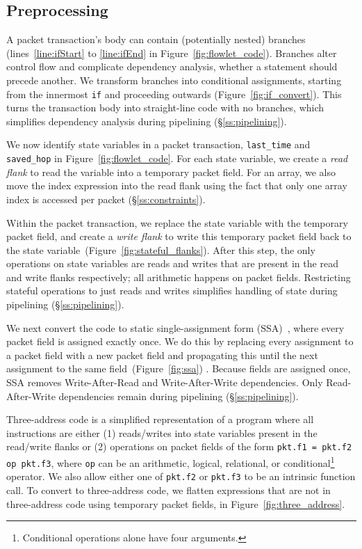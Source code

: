 \subsection{Preprocessing}
\label{ss:preprocessing}

 A packet transaction's body can contain (potentially
nested) branches (\eg lines~\ref{line:ifStart} to \ref{line:ifEnd} in
Figure~\ref{fig:flowlet_code}).  Branches alter control flow and complicate
dependency analysis, \ie whether a statement should precede another.  We
transform branches into conditional assignments, starting from the innermost
\texttt{if} and proceeding outwards (Figure~\ref{fig:if_convert}).  This turns
the transaction body into straight-line code with no branches, which simplifies
dependency analysis during pipelining (\S\ref{ss:pipelining}).

 We now identify state variables
in a packet transaction, \eg \texttt{last\_time} and \texttt{saved\_hop} in
Figure~\ref{fig:flowlet_code}.  For each state variable, we create a
\textit{read flank} to read the variable into a temporary packet field.  For an
array, we also move the index expression into the read flank using the fact
that only one array index is accessed per packet (\S\ref{ss:constraints}).

Within the packet transaction, we replace the state variable with the temporary
packet field, and create a \textit{write flank} to write this temporary packet
field back to the state variable~(Figure~\ref{fig:stateful_flanks}). After this
step, the only operations on state variables are reads and writes that are
present in the read and write flanks respectively; all arithmetic happens on
packet fields. Restricting stateful operations to just reads and writes
simplifies handling of state during pipelining (\S\ref{ss:pipelining}).

 We next convert the code to
static single-assignment form (SSA)~\cite{ssa}, where every packet field is
assigned exactly once. We do this by replacing every assignment to a packet
field with a new packet field and propagating this until the next assignment to
the same field~(Figure~\ref{fig:ssa}) .  Because fields are assigned once, SSA
removes Write-After-Read and Write-After-Write dependencies.  Only
Read-After-Write dependencies remain during pipelining (\S\ref{ss:pipelining}).

 Three-address code is a simplified
representation of a program where all instructions are either (1) reads/writes
into state variables present in the read/write flanks or (2) operations on
packet fields of the form \texttt{pkt.f1 = pkt.f2 op pkt.f3}, where \texttt{op}
can be an arithmetic, logical, relational, or conditional\footnote{Conditional
operations alone have four arguments.} operator. We also allow either one of
{\tt pkt.f2} or {\tt pkt.f3} to be an intrinsic function call.  To convert to
three-address code, we flatten expressions that are not in three-address code
using temporary packet fields,  in
Figure~\ref{fig:three_address}.

